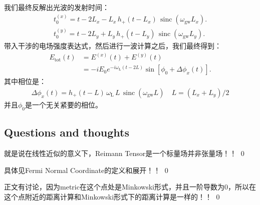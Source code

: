 我们最终反解出光波的发射时间：
\begin{align}
  t_0^{(x)} = t - 2L_x - L_x\, h_+(t - L_x)\,\operatorname{sinc}\!\left(\omega_{\mathrm{gw}} L_x\right).\\ 
  t_0^{(y)} = t - 2L_y + L_y\, h_+(t - L_y)\,\operatorname{sinc}\!\left(\omega_{\mathrm{gw}} L_y\right).
\end{align}
带入干涉的电场强度表达式，然后进行一波计算之后，我们最终得到：
\begin{align}
  E_{\mathrm{tot}}(t)&=E^{(x)}(t)+E^{(y)}(t)\\
  &=-iE_0e^{-i\omega_\mathrm{L}(t-2L)}\sin[\phi_0+\Delta\phi_x(t)].
\end{align}
其中相位是：
\begin{align}
  \Delta\phi_x(t) = h_+(t-L)\,\omega_{\mathrm{L}}\,L\,\operatorname{sinc}(\omega_{\mathrm{gw}}L) \quad L = (L_x + L_y)/2 
\end{align}
并且$ \phi_0 $是一个无关紧要的相位。

\bigskip
{}



\subsection{Questions and thoughts}


就是说在线性近似的意义下，Reimann Tensor是一个标量场并非张量场！！
\qed 


\bigskip
{}
具体见Fermi Normal Coordinate的定义和展开！！
\qed


\bigskip
{}
正文有讨论，因为metric在这个点处是Minkowski形式，并且一阶导数为0，所以在这个点附近的距离计算和Minkowski形式下的距离计算是一样的！！
\qed
